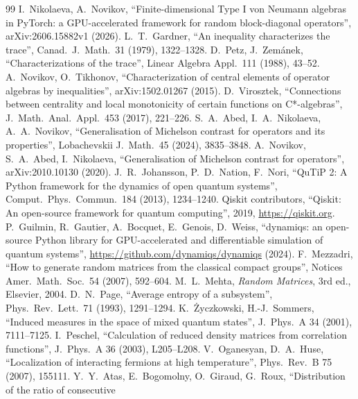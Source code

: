 \documentclass[11pt]{article}
\begin{document}
{\sloppy
\begin{thebibliography}{99}
 I.~Nikolaeva, A.~Novikov, ``Finite-dimensional Type I von Neumann algebras in PyTorch: a
  GPU-accelerated framework for random block-diagonal operators'', arXiv:2606.15882v1 (2026).
 L.~T.~Gardner, ``An inequality characterizes the trace'', Canad.\ J.\ Math.\ 31
  (1979), 1322--1328.
 D.~Petz, J.~Zem\'anek, ``Characterizations of the trace'', Linear Algebra Appl.\ 111
  (1988), 43--52.
 A.~Novikov, O.~Tikhonov, ``Characterization of central elements of operator
  algebras by inequalities'', arXiv:1502.01267 (2015).
 D.~Virosztek, ``Connections between centrality and local monotonicity of certain
  functions on C*-algebras'', J.\ Math.\ Anal.\ Appl.\ 453 (2017), 221--226.
 S.~A.~Abed, I.~A.~Nikolaeva, A.~A.~Novikov, ``Generalisation of Michelson contrast for
  operators and its properties'', Lobachevskii J.\ Math.\ 45 (2024), 3835--3848.
 A.~Novikov, S.~A.~Abed, I.~Nikolaeva, ``Generalisation of Michelson contrast for
  operators'', arXiv:2010.10130 (2020).
 J.~R.~Johansson, P.~D.~Nation, F.~Nori, ``QuTiP 2: A Python framework for the
  dynamics of open quantum systems'', Comput.\ Phys.\ Commun.\ 184 (2013), 1234--1240.
 Qiskit contributors, ``Qiskit: An open-source framework for quantum computing'', 2019,
  \url{https://qiskit.org}.
 P.~Guilmin, R.~Gautier, A.~Bocquet, E.~Genois, D.~Weiss, ``dynamiqs: an open-source
  Python library for GPU-accelerated and differentiable simulation of quantum systems'',
  \url{https://github.com/dynamiqs/dynamiqs} (2024).
 F.~Mezzadri, ``How to generate random matrices from the classical compact
  groups'', Notices Amer.\ Math.\ Soc.\ 54 (2007), 592--604.
 M.~L.~Mehta, \emph{Random Matrices}, 3rd ed., Elsevier, 2004.
 D.~N.~Page, ``Average entropy of a subsystem'', Phys.\ Rev.\ Lett.\ 71 (1993),
  1291--1294.
 K.~\.Zyczkowski, H.-J.~Sommers, ``Induced measures in the space of mixed quantum
  states'', J.\ Phys.\ A 34 (2001), 7111--7125.
 I.~Peschel, ``Calculation of reduced density matrices from correlation functions'',
  J.\ Phys.\ A 36 (2003), L205--L208.
 V.~Oganesyan, D.~A.~Huse, ``Localization of interacting fermions at high temperature'',
  Phys.\ Rev.\ B 75 (2007), 155111.
 Y.~Y.~Atas, E.~Bogomolny, O.~Giraud, G.~Roux, ``Distribution of the ratio of consecutive

\end{thebibliography}}
\end{document}
